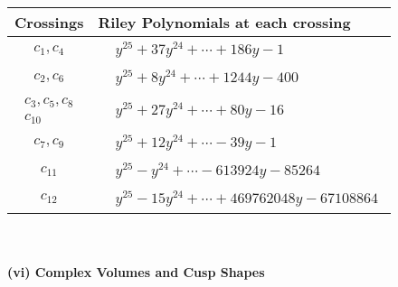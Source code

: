 \documentclass[1p]{elsarticle_modified}
\theoremstyle{definition}
\begin{document}
\begin{tabular}{m{50pt}|m{274pt}}
Crossings & \hspace{64pt}Riley Polynomials at each crossing \\
\hline $$\begin{aligned}c_{1},c_{4}\end{aligned}$$&$\begin{aligned}
&y^{25}+37 y^{24}+\cdots+186 y-1
\end{aligned}$\\
\hline $$\begin{aligned}c_{2},c_{6}\end{aligned}$$&$\begin{aligned}
&y^{25}+8 y^{24}+\cdots+1244 y-400
\end{aligned}$\\
\hline $$\begin{aligned}c_{3},c_{5},c_{8}\\c_{10}\end{aligned}$$&$\begin{aligned}
&y^{25}+27 y^{24}+\cdots+80 y-16
\end{aligned}$\\
\hline $$\begin{aligned}c_{7},c_{9}\end{aligned}$$&$\begin{aligned}
&y^{25}+12 y^{24}+\cdots-39 y-1
\end{aligned}$\\
\hline $$\begin{aligned}c_{11}\end{aligned}$$&$\begin{aligned}
&y^{25}- y^{24}+\cdots-613924 y-85264
\end{aligned}$\\
\hline $$\begin{aligned}c_{12}\end{aligned}$$&$\begin{aligned}
&y^{25}-15 y^{24}+\cdots+469762048 y-67108864
\end{aligned}$\\
\hline
\end{tabular}\\~\\
\newpage\flushleft \textbf{(vi) Complex Volumes and Cusp Shapes}
\end{document}
